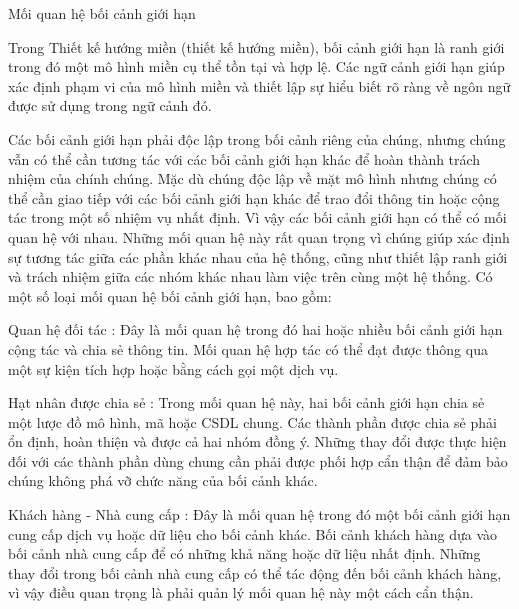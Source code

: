 





 

Mối quan hệ bối cảnh giới hạn

Trong Thiết kế hướng miền (thiết kế hướng miền), bối cảnh giới hạn là ranh giới trong đó một mô hình miền cụ thể tồn tại và hợp lệ. Các ngữ cảnh giới hạn giúp xác định phạm vi của mô hình miền và thiết lập sự hiểu biết rõ ràng về ngôn ngữ được sử dụng trong ngữ cảnh đó.

Các bối cảnh giới hạn phải độc lập trong bối cảnh riêng của chúng, nhưng chúng vẫn có thể cần tương tác với các bối cảnh giới hạn khác để hoàn thành trách nhiệm của chính chúng. Mặc dù chúng độc lập về mặt mô hình nhưng chúng có thể cần giao tiếp với các bối cảnh giới hạn khác để trao đổi thông tin hoặc cộng tác trong một số nhiệm vụ nhất định. Vì vậy các bối cảnh giới hạn có thể có mối quan hệ với nhau. Những mối quan hệ này rất quan trọng vì chúng giúp xác định sự tương tác giữa các phần khác nhau của hệ thống, cũng như thiết lập ranh giới và trách nhiệm giữa các nhóm khác nhau làm việc trên cùng một hệ thống. Có một số loại mối quan hệ bối cảnh giới hạn, bao gồm:

Quan hệ đối tác : Đây là mối quan hệ trong đó hai hoặc nhiều bối cảnh giới hạn cộng tác và chia sẻ thông tin. Mối quan hệ hợp tác có thể đạt được thông qua một sự kiện tích hợp hoặc bằng cách gọi một dịch vụ.

Hạt nhân được chia sẻ : Trong mối quan hệ này, hai bối cảnh giới hạn chia sẻ một lược đồ mô hình, mã hoặc CSDL chung. Các thành phần được chia sẻ phải ổn định, hoàn thiện và được cả hai nhóm đồng ý. Những thay đổi được thực hiện đối với các thành phần dùng chung cần phải được phối hợp cẩn thận để đảm bảo chúng không phá vỡ chức năng của bối cảnh khác.

Khách hàng - Nhà cung cấp : Đây là mối quan hệ trong đó một bối cảnh giới hạn cung cấp dịch vụ hoặc dữ liệu cho bối cảnh khác. Bối cảnh khách hàng dựa vào bối cảnh nhà cung cấp để có những khả năng hoặc dữ liệu nhất định. Những thay đổi trong bối cảnh nhà cung cấp có thể tác động đến bối cảnh khách hàng, vì vậy điều quan trọng là phải quản lý mối quan hệ này một cách cẩn thận.

